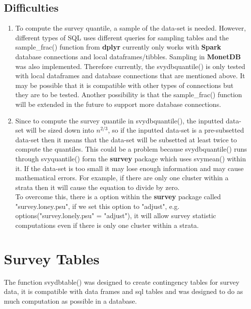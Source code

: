 \subsection{Difficulties}
\begin{enumerate}
\item To compute the survey quantile, a sample of the data-set is needed. However, different types of {\sf SQL} uses different queries for sampling tables and the {\ttfamily sample\_frac()} function from {\bf dplyr} currently only works with {\bf Spark} \citep{sparkpackage} database connections and local dataframes/tibbles. Sampling in {\bf MonetDB} \citep{monetdb} was also implemented. Therefore currently, the {\ttfamily svydbquantile()} is only tested with local dataframes and database connections that are mentioned above. It may be possible that it is compatible with other types of connections but they are to be tested. Another possibility is that the {\ttfamily sample\_frac()} function will be extended in the future to support more database connections.

\item Since to compute the survey quantile in {\ttfamily svydbquantile()}, the inputted data-set will be sized down into $n^{2/3}$, so if the inputted data-set is a pre-subsetted data-set then it means that the data-set will be subsetted at least twice to compute the quantiles. This could be a problem because {\ttfamily svydbquantile()} runs through {\ttfamily svyquantile()} form the {\bf survey} package which uses {\ttfamily svymean()} within it. If the data-set is too small it may lose enough information and may cause mathematical errors. For example, if there are only one cluster within a strata then it will cause the equation to divide by zero. 
\\
To overcome this, there is a option within the {\bf survey} package called "survey.loney.psu", if we set this option to "adjust", e.g. {\ttfamily options("survey.lonely.psu" = "adjust")}, it will allow survey statistic computations even if there is only one cluster within a strata.

\end{enumerate}


\newpage
\section{Survey Tables}
The function {\ttfamily svydbtable()} was designed to create contingency tables for survey data, it is compatible with data frames and sql tables and was designed to do as much computation as possible in a database.\\

